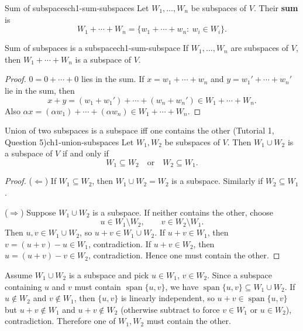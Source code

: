 \begin{definition}{Sum of subspaces}{ch1-sum-subspaces}
Let $W_1,\ldots,W_n$ be subspaces of $V$.
Their \textbf{sum} is
\[
W_1+\cdots+W_n=\{w_1+\cdots+w_n:\ w_i\in W_i\}.
\]
\end{definition}

\begin{theorem}{Sum of subspaces is a subspace}{ch1-sum-subspace}
If $W_1,\ldots,W_n$ are subspaces of $V$, then $W_1+\cdots+W_n$ is a subspace of $V$.
\begin{proof}
$0=0+\cdots+0$ lies in the sum.
If $x=w_1+\cdots+w_n$ and $y=w_1'+\cdots+w_n'$ lie in the sum, then
\[
x+y=(w_1+w_1')+\cdots+(w_n+w_n')\in W_1+\cdots+W_n.
\]
Also $\alpha x=(\alpha w_1)+\cdots+(\alpha w_n)\in W_1+\cdots+W_n$.
\end{proof}
\end{theorem}

\begin{theorem}{Union of two subspaces is a subspace iff one contains the other (Tutorial 1, Question 5)}{ch1-union-subspaces}
Let $W_1,W_2$ be subspaces of $V$. Then $W_1\cup W_2$ is a subspace of $V$ if and only if
\[
W_1\subseteq W_2 \quad \text{or}\quad W_2\subseteq W_1.
\]
\begin{proof}
($\Leftarrow$) If $W_1\subseteq W_2$, then $W_1\cup W_2=W_2$ is a subspace. Similarly if $W_2\subseteq W_1$.

($\Rightarrow$) Suppose $W_1\cup W_2$ is a subspace. If neither contains the other, choose
\[
u\in W_1\setminus W_2,\qquad v\in W_2\setminus W_1.
\]
Then $u,v\in W_1\cup W_2$, so $u+v\in W_1\cup W_2$.
If $u+v\in W_1$, then $v=(u+v)-u\in W_1$, contradiction. If $u+v\in W_2$, then $u=(u+v)-v\in W_2$, contradiction.
Hence one must contain the other.
\end{proof}
\end{theorem}

\begin{policynote}[title={Extension (Tutorial 1, Question 5, Method 2)}]
Assume $W_1\cup W_2$ is a subspace and pick $u\in W_1$, $v\in W_2$.
Since a subspace containing $u$ and $v$ must contain $\operatorname{span}\{u,v\}$, we have $\operatorname{span}\{u,v\}\subseteq W_1\cup W_2$.
If $u\notin W_2$ and $v\notin W_1$, then $\{u,v\}$ is linearly independent, so $u+v\in\operatorname{span}\{u,v\}$ but $u+v\notin W_1$ and $u+v\notin W_2$ (otherwise subtract to force $v\in W_1$ or $u\in W_2$), contradiction.
Therefore one of $W_1,W_2$ must contain the other.
\end{policynote}

